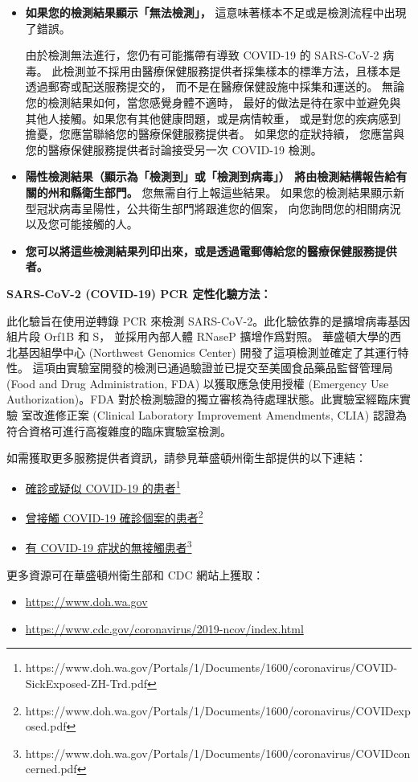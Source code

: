 \documentclass[10pt]{article}
\newcommand{\link}[2]{\href{#1}{#2}\footnote{#1}}
\begin{document}
\begin{itemize}
\item

  \textbf{如果您的檢測結果顯示「無法檢測」，} 這意味著樣本不足或是檢測流程中出現了錯誤。

  由於檢測無法進行，您仍有可能攜帶有導致 COVID-19 的 SARS-CoV-2 病毒。
  此檢測並不採用由醫療保健服務提供者採集樣本的標準方法，且樣本是透過郵寄或配送服務提交的，
  而不是在醫療保健設施中採集和運送的。 無論您的檢測結果如何，當您感覺身體不適時，
  最好的做法是待在家中並避免與其他人接觸。如果您有其他健康問題，或是病情較重，
  或是對您的疾病感到擔憂，您應當聯絡您的醫療保健服務提供者。 如果您的症狀持續，
  您應當與您的醫療保健服務提供者討論接受另一次 COVID-19 檢測。

\item

  \textbf{陽性檢測結果（顯示為「檢測到」或「檢測到病毒」）
  將由檢測結構報告給有關的州和縣衛生部門。} 您無需自行上報這些結果。
  如果您的檢測結果顯示新型冠狀病毒呈陽性，公共衛生部門將跟進您的個案，
  向您詢問您的相關病況以及您可能接觸的人。

\item

  \textbf{您可以將這些檢測結果列印出來，或是透過電郵傳給您的醫療保健服務提供者。}

\end{itemize}

\bigskip
\textbf{SARS-CoV-2 (COVID-19) PCR 定性化驗方法：}

此化驗旨在使用逆轉錄 PCR 來檢測 SARS-CoV-2。此化驗依靠的是擴增病毒基因組片段 Orf1B 和 S，
並採用內部人體 RNaseP 擴增作爲對照。 華盛頓大學的西北基因組學中心 (Northwest Genomics
Center) 開發了這項檢測並確定了其運行特性。
這項由實驗室開發的檢測已通過驗證並已提交至美國食品藥品監督管理局 (Food and Drug
Administration, FDA) 以獲取應急使用授權 (Emergency Use Authorization)。FDA
對於檢測驗證的獨立審核為待處理狀態。此實驗室經臨床實驗 室改進修正案 (Clinical Laboratory
Improvement Amendments, CLIA) 認證為符合資格可進行高複雜度的臨床實驗室檢測。

如需獲取更多服務提供者資訊，請參見華盛頓州衛生部提供的以下連結：

\begin{itemize}
\item

  \link{https://www.doh.wa.gov/Portals/1/Documents/1600/coronavirus/COVID-SickExposed-ZH-Trd.pdf}{確診或疑似
  COVID-19 的患者}

\item

  \link{https://www.doh.wa.gov/Portals/1/Documents/1600/coronavirus/COVIDexposed.pdf}{曾接觸
  COVID-19 確診個案的患者}

\item

  \link{https://www.doh.wa.gov/Portals/1/Documents/1600/coronavirus/COVIDconcerned.pdf}{有
  COVID-19 症狀的無接觸患者}

\end{itemize}

更多資源可在華盛頓州衛生部和 CDC 網站上獲取：

\begin{itemize}
\item

  \url{https://www.doh.wa.gov}

\item

  \url{https://www.cdc.gov/coronavirus/2019-ncov/index.html}

\end{itemize}
\end{document}

